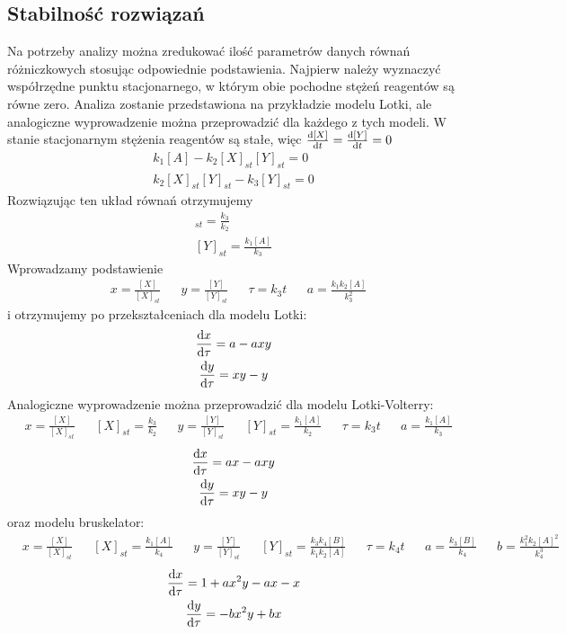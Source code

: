 \documentclass[10pt, a4paper, twoside, onecolumn]{article}
\numberwithin{equation}{section}
\begin{document}
	\subsection{Stabilność rozwiązań}
	Na potrzeby analizy można zredukować ilość parametrów danych równań różniczkowych stosując odpowiednie podstawienia. Najpierw należy wyznaczyć współrzędne punktu stacjonarnego, w którym obie pochodne stężeń reagentów są równe zero. Analiza zostanie przedstawiona na przykładzie modelu Lotki, ale analogiczne wyprowadzenie można przeprowadzić dla każdego z tych modeli. W stanie stacjonarnym stężenia reagentów są stałe, więc \(\dv{[X]}{t}=\dv{[Y]}{t}=0\)
	\begin{gather}
		k_{1}[A]-k_{2}[X]_{st}[Y]_{st}=0 \\
		k_{2}[X]_{st}[Y]_{st}-k_{3}[Y]_{st}=0
	\end{gather}
	Rozwiązując ten układ równań otrzymujemy
	\begin{gather}
		[X]_{st}=\frac{k_{3}}{k_{2}} \\
		[Y]_{st}=\frac{k_{1}[A]}{k_{3}}
	\end{gather}
	Wprowadzamy podstawienie
	\begin{align*}
		& x=\frac{[X]}{[X]_{st}} && y=\frac{[Y]}{[Y]_{st}} && \tau=k_{3}t && a=\frac{k_{1}k_{2}[A]}{k_{3}^{2}}
	\end{align*}
	i otrzymujemy po przekształceniach dla modelu Lotki:
	\begin{gather}
		\dv{x}{\tau}=a-axy \\
		\dv{y}{\tau}=xy-y
	\end{gather}
	Analogiczne wyprowadzenie można przeprowadzić dla modelu Lotki-Volterry:
	\begin{align}
		& x=\frac{[X]}{[X]_{st}} && [X]_{st} = \frac{k_{3}}{k_{2}} && y=\frac{[Y]}{[Y]_{st}} && [Y]_{st} = \frac{k_{1}[A]}{k_{2}} && \tau=k_{3}t && a=\frac{k_{1}[A]}{k_{3}}
	\end{align}
	\begin{gather}
		\dv{x}{\tau}=ax-axy \\
		\dv{y}{\tau}=xy-y
	\end{gather}
	oraz modelu bruskelator:
	\begin{align}
		& x=\frac{[X]}{[X]_{st}} && [X]_{st} = \frac{k_{1}[A]}{k_{4}} && y=\frac{[Y]}{[Y]_{st}} && [Y]_{st} = \frac{k_{3}k_{4}[B]}{k_{1}k_{2}[A]} && \tau=k_{4}t && a=\frac{k_{3}[B]}{k_{4}} && b=\frac{k_{1}^{2}k_{2}[A]^{2}}{k_{4}^{3}}
	\end{align}
	\begin{gather}
		\dv{x}{\tau}=1+ax^{2}y-ax-x \\
		\dv{y}{\tau}=-bx^{2}y+bx
	\end{gather}
\end{document}
